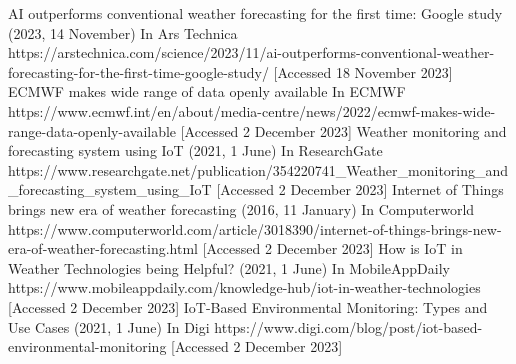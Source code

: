 \documentclass[../paper.tex]{subfiles}
\begin{document}
\begin{thebibliography}{00}
     AI outperforms conventional weather forecasting for the first time: Google study (2023, 14 November) In Ars Technica https://arstechnica.com/science/2023/11/ai-outperforms-conventional-weather-forecasting-for-the-first-time-google-study/ [Accessed 18 November 2023]
     ECMWF makes wide range of data openly available In ECMWF https://www.ecmwf.int/en/about/media-centre/news/2022/ecmwf-makes-wide-range-data-openly-available [Accessed 2 December 2023]
     Weather monitoring and forecasting system using IoT (2021, 1 June) In ResearchGate https://www.researchgate.net/publication/354220741\_Weather\_monitoring\_and\_forecasting\_system\_using\_IoT [Accessed 2 December 2023]
     Internet of Things brings new era of weather forecasting (2016, 11 January) In Computerworld https://www.computerworld.com/article/3018390/internet-of-things-brings-new-era-of-weather-forecasting.html [Accessed 2 December 2023]
     How is IoT in Weather Technologies being Helpful?
    (2021, 1 June) In MobileAppDaily https://www.mobileappdaily.com/knowledge-hub/iot-in-weather-technologies [Accessed 2 December 2023]
     IoT-Based Environmental Monitoring: Types and Use Cases (2021, 1 June) In Digi https://www.digi.com/blog/post/iot-based-environmental-monitoring [Accessed 2 December 2023]
\end{thebibliography}
\end{document}
